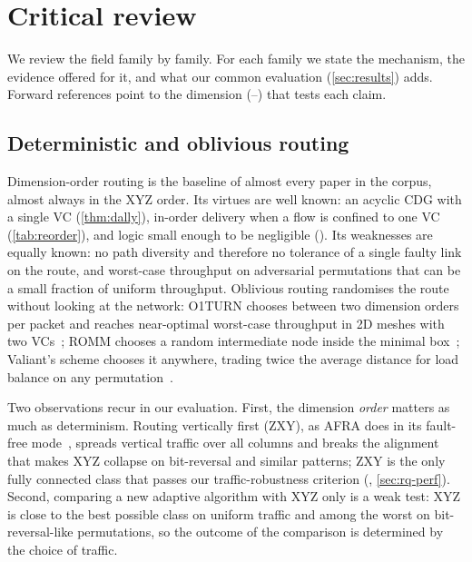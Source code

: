 \begin{table}[tbp]
\centering
\caption{Historical reference designs (before 2021) used as baselines or as deadlock arguments by the corpus. Deadlock argument as in \cref{tab:corpus}.}
\label{tab:hist}
\scriptsize
\setlength{\tabcolsep}{3pt}

\end{table}

\section{Critical review}
\label{sec:review}

We review the field family by family. For each family we state the mechanism, the evidence offered for it, and what our common evaluation (\cref{sec:results}) adds. Forward references point to the dimension (--) that tests each claim.

\subsection{Deterministic and oblivious routing}
\label{sec:rev-det}

Dimension-order routing is the baseline of almost every paper in the corpus, almost always in the XYZ order. Its virtues are well known: an acyclic CDG with a single VC (\cref{thm:dally}), in-order delivery when a flow is confined to one VC (\cref{tab:reorder}), and logic small enough to be negligible (). Its weaknesses are equally known: no path diversity and therefore no tolerance of a single faulty link on the route, and worst-case throughput on adversarial permutations that can be a small fraction of uniform throughput. Oblivious routing randomises the route without looking at the network: O1TURN chooses between two dimension orders per packet and reaches near-optimal worst-case throughput in 2D meshes with two VCs~\cite{seo2005o1turn}; ROMM chooses a random intermediate node inside the minimal box~\cite{nesson1995romm}; Valiant's scheme chooses it anywhere, trading twice the average distance for load balance on any permutation~\cite{valiant1981universal}.

Two observations recur in our evaluation. First, the dimension \emph{order} matters as much as determinism. Routing vertically first (ZXY), as AFRA does in its fault-free mode~\cite{akbari2012afra}, spreads vertical traffic over all columns and breaks the alignment that makes XYZ collapse on bit-reversal and similar patterns; ZXY is the only fully connected class that passes our traffic-robustness criterion (, \cref{sec:rq-perf}). Second, comparing a new adaptive algorithm with XYZ only is a weak test: XYZ is close to the best possible class on uniform traffic and among the worst on bit-reversal-like permutations, so the outcome of the comparison is determined by the choice of traffic.

